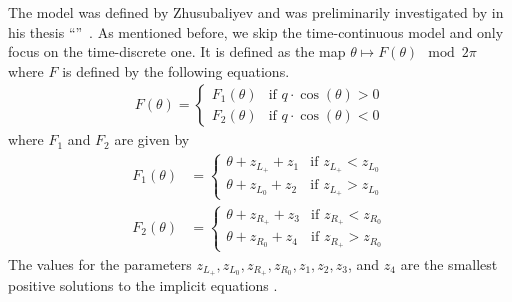 The model was defined by Zhusubaliyev and was preliminarily investigated by  in his thesis ``''~\cite{akyuz2022}.
As mentioned before, we skip the time-continuous model and only focus on the time-discrete one.
It is defined as the map $\theta \mapsto F(\theta) \mod 2 \pi$ where $F$ is defined by the following equations.
\begin{align}
	F(\theta) = \begin{cases}
		            F_1(\theta) & \text{if } q \cdot \cos(\theta) > 0 \\
		            F_2(\theta) & \text{if } q \cdot \cos(\theta) < 0
	            \end{cases}
\end{align}
where $F_1$ and $F_2$ are given by
\begin{subequations}
	\begin{align}
		F_1(\theta) & = \begin{cases}
			                \theta + z_{L_+} + z_1 & \text{if } z_{L_+} < z_{L_0} \\
			                \theta + z_{L_0} + z_2 & \text{if } z_{L_+} > z_{L_0}
		                \end{cases} \\
		F_2(\theta) & = \begin{cases}
			                \theta + z_{R_+} + z_3 & \text{if } z_{R_+} < z_{R_0} \\
			                \theta + z_{R_0} + z_4 & \text{if } z_{R_+} > z_{R_0}
		                \end{cases}
	\end{align}
\end{subequations}
The values for the parameters $z_{L_+}, z_{L_0}, z_{R_+}, z_{R_0}, z_1, z_2, z_3$, and $z_4$ are the smallest positive solutions to the implicit equations .
